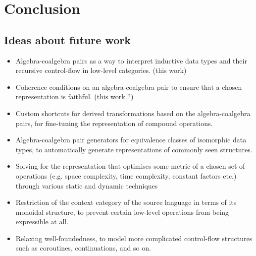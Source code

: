\section{Conclusion}\label{sec:conclusion}

\subsection{Ideas about future work}

\begin{itemize}
  \item Algebra-coalgebra pairs as a way to interpret inductive data types and their
        recursive control-flow in low-level categories. (this work)
  \item Coherence conditions on an algebra-coalgebra pair to ensure that a chosen
        representation is faithful. (this work ?)
  \item Custom shortcuts for derived transformations based on the algebra-coalgebra
        pairs, for fine-tuning the representation of compound operations.
  \item Algebra-coalgebra pair generators for equivalence classes of isomorphic data
        types, to automatically generate representations of commonly seen structures.
  \item Solving for the representation that optimises some metric of a chosen set of
        operations (e.g. space complexity, time complexity, constant factors etc.)
        through various static and dynamic techniques
  \item Restriction of the context category of the source language in terms of its
        monoidal structure, to prevent certain low-level operations from being
        expressible at all.
  \item Relaxing well-foundedness, to model more complicated control-flow structures
        such as coroutines, continuations, and so on.
\end{itemize}
